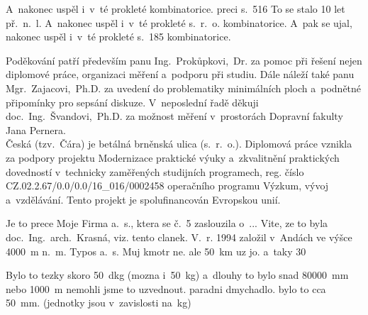 
A~nakonec uspěl i~v~té prokleté kombinatorice.
preci s.~516
To se stalo 10 let př.~n.~l.
A~nakonec uspěl i~v~té prokleté s.~r.~o. kombinatorice. A~pak se ujal, nakonec uspěl i~v~té prokleté s.~185 kombinatorice.

\noindent Poděkování patří především panu Ing.~Prokůpkovi,~Dr. za pomoc při řešení nejen diplomové práce, organizaci měření a~podporu při studiu. Dále náleží také panu Mgr.~Zajacovi,~Ph.D. za uvedení do problematiky minimálních ploch a~podnětné připomínky pro sepsání diskuze. V~neposlední řadě děkuji doc.~Ing.~Švandovi,~Ph.D. za možnost měření v~prostorách Dopravní fakulty Jana Pernera.\\
Česká (tzv.~Čára) je betálná brněnská ulica (s.~r.~o.).
\noindent Diplomová práce vznikla za podpory projektu Modernizace praktické výuky a~zkvalitnění praktických dovedností v~technicky zaměřených studijních programech, reg. číslo CZ.02.2.67/0.0/0.0/16\_016/0002458 operačního programu Výzkum, vývoj a~vzdělávání. Tento projekt je spolufinancován Evropskou unií.

Je to prece Moje Firma a.~s., ktera se č.~5 zaslouzila o~... Vite, ze to byla doc.~Ing.~arch.~Krasná, viz. tento clanek.
V.~r. 1994 založil v~Andách ve výšce 4000~m n.~m. Typos a.~s.
Muj kmotr ne. ale 50~km uz jo. a~taky 30~%


Bylo to tezky skoro 50~dkg (mozna i~50~kg) a~dlouhy to bylo snad 80000~mm nebo 1000~m nemohli jsme to uzvednout.
paradni dmychadlo. bylo to cca 50~mm. (jednotky jsou v~zavislosti na~kg)
